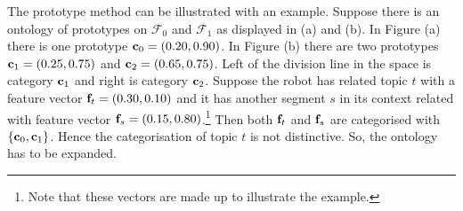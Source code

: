 The prototype method can be illustrated with an example. Suppose there is an ontology of prototypes on ${\mathcal F}_0$ and ${\mathcal F}_1$ as displayed in  (a) and (b). In Figure (a) there is one prototype ${\bf c}_0=(0.20,0.90)$. In Figure (b) there are two prototypes ${\bf c}_1=(0.25,0.75)$ and ${\bf c}_2=(0.65,0.75)$. Left of the division line in the space is category ${\bf c}_1$ and right is category ${\bf c}_2$. Suppose the robot has related topic $t$ with a feature vector ${\bf f}_t=(0.30,0.10)$ and it has another segment $s$ in its context related with feature vector ${\bf f}_s=(0.15,0.80)$.\footnote{Note that these vectors are made up to illustrate the example.} Then both ${\bf f}_t$ and ${\bf f}_s$ are categorised with $\{{\bf c}_0,{\bf c}_1\}$. Hence the categorisation of topic $t$ is not distinctive. So, the ontology has to be expanded. 

